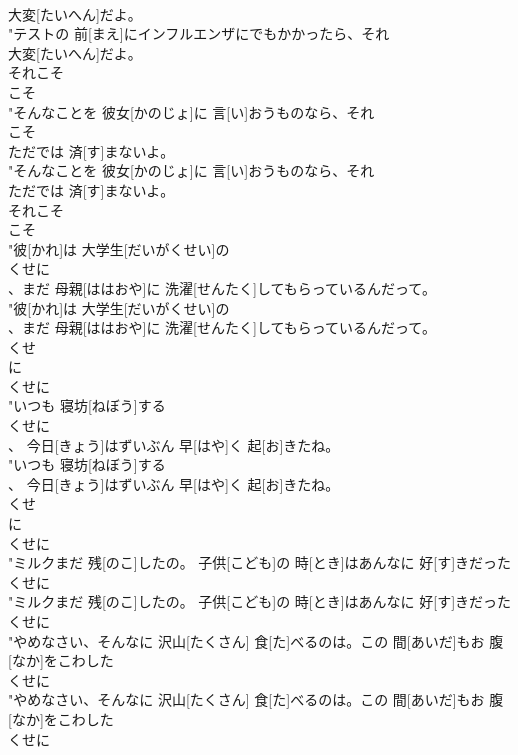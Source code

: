 \documentclass[8pt]{extreport}
\begin{document}
\begin{CJK}{UTF8}{min}
\\	大変[たいへん]だよ。
\\	"テストの 前[まえ]にインフルエンザにでもかかったら、それ
\\	大変[たいへん]だよ。
\\	それこそ	
\\	こそ
\\	"そんなことを 彼女[かのじょ]に 言[い]おうものなら、それ
\\	こそ
\\	ただでは 済[す]まないよ。
\\	"そんなことを 彼女[かのじょ]に 言[い]おうものなら、それ
\\	ただでは 済[す]まないよ。
\\	それこそ	
\\	こそ
\\	"彼[かれ]は 大学生[だいがくせい]の
\\	くせに
\\	、まだ 母親[ははおや]に 洗濯[せんたく]してもらっているんだって。
\\	"彼[かれ]は 大学生[だいがくせい]の
\\	、まだ 母親[ははおや]に 洗濯[せんたく]してもらっているんだって。
\\	くせ 
\\	に 
\\	くせに
\\	"いつも 寝坊[ねぼう]する
\\	くせに
\\	、 今日[きょう]はずいぶん 早[はや]く 起[お]きたね。
\\	"いつも 寝坊[ねぼう]する
\\	、 今日[きょう]はずいぶん 早[はや]く 起[お]きたね。
\\	くせ 
\\	に 
\\	くせに
\\	"ミルクまだ 残[のこ]したの。 子供[こども]の 時[とき]はあんなに 好[す]きだった
\\	くせに
\\	"ミルクまだ 残[のこ]したの。 子供[こども]の 時[とき]はあんなに 好[す]きだった
\\	くせに
\\	"やめなさい、そんなに 沢山[たくさん] 食[た]べるのは。この 間[あいだ]もお 腹[なか]をこわした
\\	くせに
\\	"やめなさい、そんなに 沢山[たくさん] 食[た]べるのは。この 間[あいだ]もお 腹[なか]をこわした
\\	くせに

\end{CJK}
\end{document}

